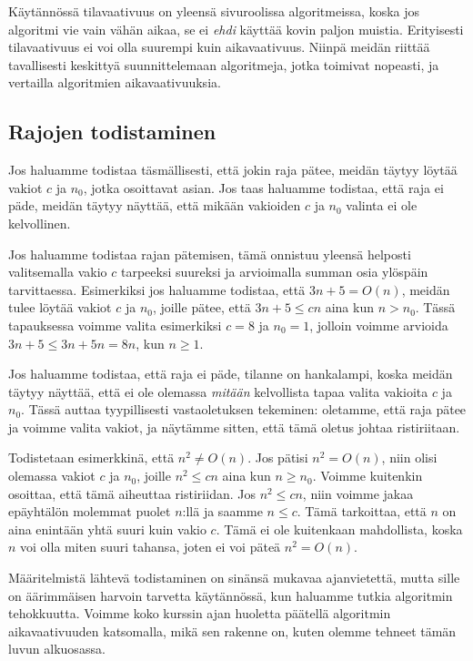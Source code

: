 Käytännössä tilavaativuus on yleensä sivuroolissa algoritmeissa,
koska jos algoritmi vie vain vähän aikaa, se ei \emph{ehdi} käyttää kovin paljon muistia.
Erityisesti tilavaativuus ei voi olla suurempi kuin aikavaativuus.
Niinpä meidän riittää tavallisesti keskittyä suunnittelemaan algoritmeja,
jotka toimivat nopeasti, ja vertailla algoritmien aikavaativuuksia.

\subsection{Rajojen todistaminen}

Jos haluamme todistaa täsmällisesti, että jokin raja pätee,
meidän täytyy löytää vakiot $c$ ja $n_0$, jotka osoittavat asian.
Jos taas haluamme todistaa, että raja ei päde,
meidän täytyy näyttää, että mikään vakioiden $c$ ja $n_0$ valinta ei ole kelvollinen.

Jos haluamme todistaa rajan pätemisen,
tämä onnistuu yleensä helposti valitsemalla vakio $c$
tarpeeksi suureksi ja arvioimalla summan osia ylöspäin tarvittaessa.
Esimerkiksi jos haluamme todistaa, että $3n+5 = O(n)$, meidän tulee löytää
vakiot $c$ ja $n_0$, joille pätee, että $3n+5 \le cn$ aina kun $n>n_0$.
Tässä tapauksessa voimme valita esimerkiksi $c=8$ ja $n_0=1$,
jolloin voimme arvioida $3n+5 \le 3n+5n=8n$, kun $n \ge 1$.

Jos haluamme todistaa, että raja ei päde, tilanne on hankalampi,
koska meidän täytyy näyttää, että ei ole olemassa \emph{mitään} kelvollista
tapaa valita vakioita $c$ ja $n_0$.
Tässä auttaa tyypillisesti vastaoletuksen tekeminen: oletamme,
että raja pätee ja voimme valita vakiot,
ja näytämme sitten, että tämä oletus johtaa ristiriitaan.

Todistetaan esimerkkinä, että $n^2 \neq O(n)$.
Jos pätisi $n^2=O(n)$, niin olisi olemassa vakiot $c$ ja $n_0$,
joille $n^2 \le cn$ aina kun $n \ge n_0$.
Voimme kuitenkin osoittaa, että tämä aiheuttaa ristiriidan.
Jos $n^2 \le cn$, niin voimme jakaa epäyhtälön molemmat puolet $n$:llä
ja saamme $n \le c$.
Tämä tarkoittaa, että $n$ on aina enintään yhtä suuri kuin vakio $c$.
Tämä ei ole kuitenkaan mahdollista, koska $n$ voi olla miten
suuri tahansa, joten ei voi päteä $n^2 = O(n)$.

Määritelmistä lähtevä todistaminen on sinänsä mukavaa ajanvietettä,
mutta sille on äärimmäisen harvoin tarvetta käytännössä,
kun haluamme tutkia algoritmin tehokkuutta.
Voimme koko kurssin ajan huoletta päätellä algoritmin aikavaativuuden
katsomalla, mikä sen rakenne on, kuten olemme tehneet tämän luvun alkuosassa.